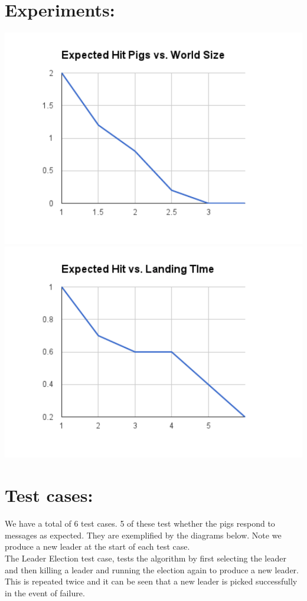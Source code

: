 \documentclass[]{article}
\makeatletter
\def\maxwidth{\ifdim\Gin@nat@width>\linewidth\linewidth
\else\Gin@nat@width\fi}
\let\Oldincludegraphics\includegraphics
\renewcommand{\includegraphics}[1]{\Oldincludegraphics[width=\maxwidth]{#1}}
\makeatother
\begin{document}
\section{Experiments:}
\includegraphics{figs/chart_1.pdf}
\includegraphics{figs/chart_2.pdf}

\pagebreak

\section{Test cases:}
We have a total of 6 test cases. 5 of these test whether the pigs respond to messages as expected. They are exemplified by the diagrams below. Note we produce a new leader at the start of each test case.\\
The Leader Election test case, tests the algorithm by first selecting the leader and then killing a leader and running the election again to produce a new leader. This is repeated twice and it can be seen that a new leader is picked successfully in the event of failure. 
\end{document}
